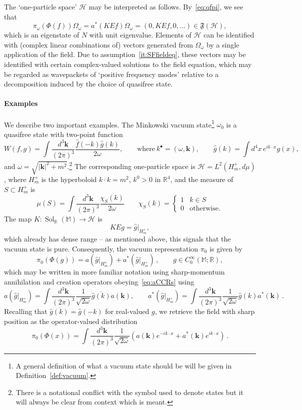 \documentclass[12pt,a4paper]{article}
\newcommand{\1}{\mathds{1}}                         %
\newcommand{\RR}{\mathbb{R}}           %
\newcommand{\MM}{\mathbb{M}}
\newcommand{\FF}{{\mathfrak{F}}}
\newcommand{\HH}{{\mathcal{H}}}
\newcommand{\kb}{{\boldsymbol{k}}}
\newcommand{\CoinX}[1]{C_0^\infty(#1)}
\DeclareMathOperator{\Sol}{Sol}
\begin{document}
The `one-particle space' $\HH$ may be interpreted as follows.  By~\eqref{eq:qfpi}, we see that
\[
\pi_\omega(\Phi(f))\Omega_\omega = a^*(KEf)\Omega_\omega = (0,KEf,0,\ldots)\in\FF(\HH) ,
\]
which is an eigenstate of $N$ with unit eigenvalue. Elements of $\HH$ can be identified with (complex linear combinations of) vectors generated from $\Omega_\omega$ by a single application of the field. Due to assumption~\ref{it:SFfieldeq}, these vectors may be identified with certain complex-valued solutions to the field equation, which may be regarded as wavepackets of `positive frequency modes' relative to a decomposition induced by the choice of quasifree state. 

\paragraph{Examples} We describe two important examples. The Minkowski vacuum state\footnote{A general definition of what a vacuum state should be will be given in Definition~\ref{def:vacuum}.} $\omega_0$ is a quasifree state with two-point function 
\[
W(f,g) = \int\frac{d^3\kb}{(2\pi)^3} \frac{\hat{f}(-k) \hat{g}(k)}{2\omega}, \qquad \text{where}~k^\bullet =(\omega,\kb),
\qquad \hat{g}(k) = \int d^4x\, e^{ik\cdot x}g(x),
\]
and $\omega=\sqrt{|\boldsymbol{k}|^2+m^2}$.\footnote{There is a notational conflict with the symbol used to denote states but it will always be clear from context which is meant.} The corresponding
one-particle space is $\HH=L^2(H^+_{m},d\mu)$, where
$H^+_m$ is the hyperboloid $k\cdot k=m^2$, $k^0>0$ in $\RR^4$,
and the measure of $S\subset H^+_m$ is
\[
\mu(S) = \int \frac{d^3\kb}{(2\pi)^3} \frac{\chi_S(k)}{2\omega}\qquad \chi_S(k)=\begin{cases} 1 & k\in S\\ 0 & \text{otherwise.}\end{cases}
\]
The map $K:\Sol_\RR(\MM)\to\HH$ is 
\[
KEg = \hat{g}|_{H^+_m},
\]
which already has dense range -- as mentioned above, this signals that the vacuum state is pure. Consequently, the vacuum representation $\pi_0$ is given by
\[
\pi_0(\Phi(g))=a(\hat{g}|_{H^+_m})+a^*(\hat{g}|_{H^+_m})\,, \qquad g\in\CoinX{\MM;\RR},
\]
which may be written in more familiar notation using sharp-momentum annihilation and creation operators obeying~\eqref{eq:aCCRs} using
\[
a(\hat{g}|_{H^+_m})=\int\frac{d^3\boldsymbol{k}}{(2\pi)^3}\frac{1}{\sqrt{2\omega}} \overline{\hat{g}(k)} a(\boldsymbol{k}),\qquad a^*(\hat{g}|_{H^+_m})=\int\frac{d^3\boldsymbol{k}}{(2\pi)^3}\frac{1}{\sqrt{2\omega}} \hat{g}(k) a^*(\boldsymbol{k})\,.
\]
Recalling that $\overline{\hat{g}(k)}=\hat{g}(-k)$ for real-valued $g$, we retrieve the field with sharp position as the operator-valued distribution
\[
\pi_0(\Phi(x))=\int \frac{d^3\boldsymbol{k}}{(2\pi)^3}\frac{1}{\sqrt{2\omega}}\left(a(\boldsymbol{k})e^{-ik\cdot x}+a^*(\boldsymbol{k})e^{ik\cdot x}
\right)\,.
\]
\end{document}
